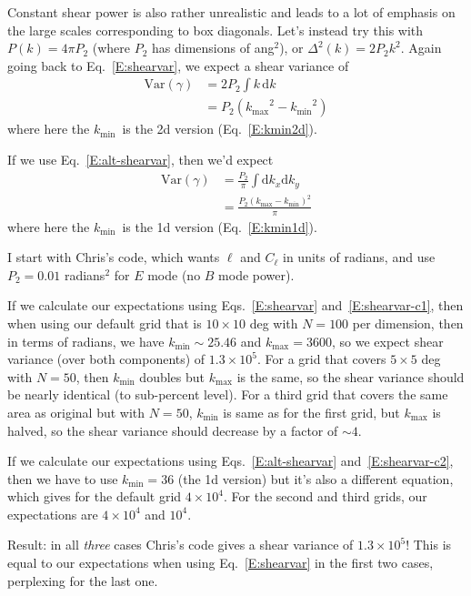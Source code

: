 \documentclass[preprint]{aastex}
\newcommand{\kmax}{\ensuremath{k_\mathrm{max}}}
\newcommand{\kmin}{\ensuremath{k_\mathrm{min}}}
\newcommand{\rmd}{\ensuremath{\mathrm{d}}}
\begin{document}
Constant shear power is also rather unrealistic and leads to a lot of
emphasis on the large scales corresponding to box diagonals.  Let's
instead try this with $P(k) = 4\pi P_2$ (where $P_2$ has dimensions of ang$^2$), or $\Delta^2(k) =
2 P_2 k^2$.  Again going back to Eq.~\ref{E:shearvar},
we expect a shear variance of
\begin{align}
\mathrm{Var}(\gamma) &= 2 P_2 \int k\,\rmd k\\
 &= P_2 (\kmax^2-\kmin^2)\label{E:shearvar-c1}
\end{align}
where here the \kmin\ is the 2d version (Eq.~\ref{E:kmin2d}).

If we use Eq.~\ref{E:alt-shearvar}, then we'd expect
\begin{align}
\mathrm{Var}(\gamma) &= \frac{P_2}{\pi} \int \rmd k_x \rmd k_y\\
  &= \frac{P_2(\kmax-\kmin)^2}{\pi}\label{E:shearvar-c2}
\end{align}
where here the \kmin\ is the 1d version  (Eq.~\ref{E:kmin1d}).

I start with Chris's code, which wants $\ell$ and $C_\ell$ in units of
radians, and use $P_2=0.01$ radians$^2$ for $E$ mode (no $B$ mode
power).  

If we calculate our expectations using Eqs.~\ref{E:shearvar} and~\ref{E:shearvar-c1}, then when
using our default grid that is $10\times 10$ deg with $N=100$ per
dimension, then in terms of radians, we have $\kmin\sim 25.46$ and
$\kmax=3600$, so we expect shear variance (over both components) of
$1.3\times 10^5$.  For a grid that covers $5\times 5$ deg with $N=50$,
then $\kmin$ doubles but $\kmax$ is the same, so the shear variance
should be nearly identical (to sub-percent level).  For a third grid
that covers the same area as original but with $N=50$, $\kmin$ is same
as for the first grid, but $\kmax$ is halved, so the shear variance
should decrease by a factor of $\sim 4$.  

If we calculate our expectations using Eqs.~\ref{E:alt-shearvar} and~\ref{E:shearvar-c2}, then
we have to use $\kmin=36$ (the 1d version) but it's also a different
equation, which gives for the default grid $4\times 10^4$.  For the
second and third grids, our expectations are $4\times 10^4$ and $10^4$.

Result: in all {\em three} cases Chris's code gives a shear variance
of $1.3\times 10^5$!  This is equal to our expectations when using
Eq.~\ref{E:shearvar} in the first two cases, perplexing for the last
one.
\end{document}
